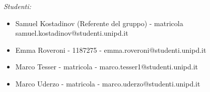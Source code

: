 \begin{titlepage}
    \begin{minipage}{1\textwidth}
        \begin{flushleft} \large
            \emph{Studenti:}\\
            \begin{itemize}
            	\item Samuel Kostadinov (Referente del gruppo) - matricola samuel.kostadinov@studenti.unipd.it
            	\item Emma Roveroni - 1187275 - emma.roveroni@studenti.unipd.it
            	\item Marco Tesser - matricola - marco.tesser1@studenti.unipd.it
            	\item Marco Uderzo - matricola - marco.uderzo@studenti.unipd.it
            \end{itemize}

        \end{flushleft}
    \end{minipage}
    
    
    
   
    
    
    \vfill 
    
\end{titlepage}